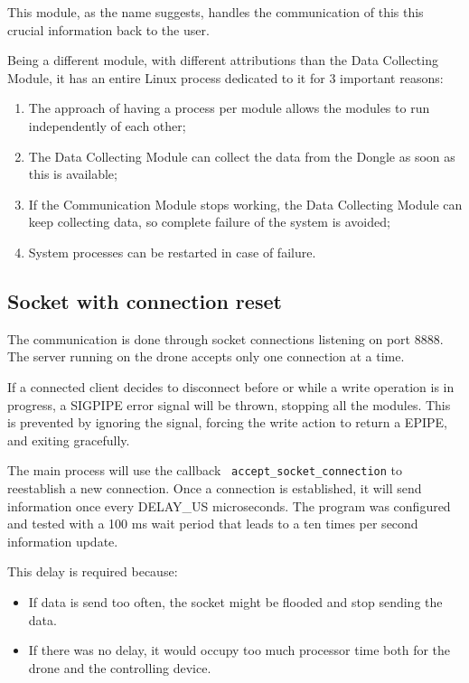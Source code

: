 This module, as the name suggests, handles the communication of this this crucial information back to the user.

Being a different module, with different attributions than the Data Collecting Module, it has an entire Linux process dedicated to it for 3 important reasons:
\begin{enumerate}

\item The approach of having a process per module allows the modules to run independently of each other;
\item The Data Collecting Module can collect the data from the Dongle as soon as this is available;
\item If the Communication Module stops working, the Data Collecting Module can keep collecting data, so complete failure of the system is avoided;
\item System processes can be restarted in case of failure.

\end{enumerate}

\subsection{Socket with connection reset}

The communication is done through socket connections listening on port 8888. The server running on the drone accepts only one connection at a time.

If a connected client decides to disconnect before or while a write operation is in progress, a SIGPIPE error signal will be thrown, stopping all the modules. This is prevented by ignoring the signal, forcing the write action to return a EPIPE, and exiting gracefully.

The main process will use the callback \texttt{ accept\_socket\_connection} to reestablish a new connection. Once a connection is established, it will send information once every DELAY\_US microseconds. The program was configured and tested with a 100 ms wait period that leads to a ten times per second information update.

This delay is required because:
\begin{itemize}

\item If data is send too often, the socket might be flooded and stop sending the data. %
\item If there was no delay, it would occupy too much processor time both for the drone and the controlling device.

\end{itemize}

